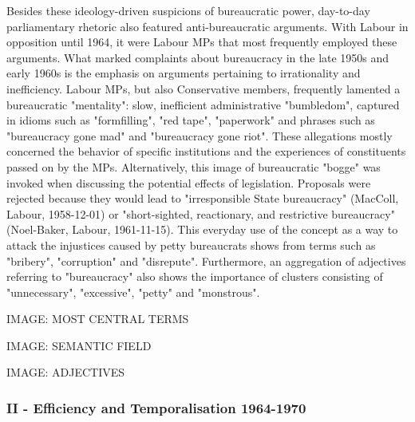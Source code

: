 \documentclass[
]{article}
\begin{document}
Besides these ideology-driven suspicions of bureaucratic power,
day-to-day parliamentary rhetoric also featured anti-bureaucratic
arguments. With Labour in opposition until 1964, it were Labour MPs that
most frequently employed these arguments. What marked complaints about
bureaucracy in the late 1950s and early 1960s is the emphasis on
arguments pertaining to irrationality and inefficiency. Labour MPs, but
also Conservative members, frequently lamented a bureaucratic
"mentality": slow, inefficient administrative "bumbledom", captured in
idioms such as "formfilling", "red tape", "paperwork" and phrases such
as "bureaucracy gone mad" and "bureaucracy gone riot". These allegations
mostly concerned the behavior of specific institutions and the
experiences of constituents passed on by the MPs. Alternatively, this
image of bureaucratic "bogge" was invoked when discussing the potential
effects of legislation. Proposals were rejected because they would lead
to "irresponsible State bureaucracy" (MacColl, Labour, 1958-12-01) or
"short-sighted, reactionary, and restrictive bureaucracy" (Noel-Baker,
Labour, 1961-11-15). This everyday use of the concept as a way to attack
the injustices caused by petty bureaucrats shows from terms such as
"bribery", "corruption" and "disrepute". Furthermore, an aggregation of
adjectives referring to "bureaucracy" also shows the importance of
clusters consisting of "unnecessary", "excessive", "petty" and
"monstrous".

IMAGE: MOST CENTRAL TERMS

IMAGE: SEMANTIC FIELD

IMAGE: ADJECTIVES

\hypertarget{header-n40}{%
\subsubsection{II - Efficiency and Temporalisation
1964-1970}\label{header-n40}}
\end{document}
